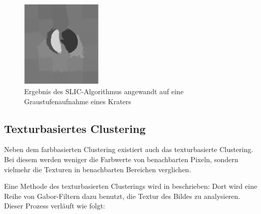 \begin{figure}[h!]
	\centering
	\includegraphics[width=0.35\textwidth,keepaspectratio]{images/gen/GEN_slic_crater.png}
	\captionsetup{format=plain,width=0.35\textwidth}
	\caption{Ergebnis des SLIC-Algorithmus angewandt auf eine Graustufenaufnahme eines Kraters}
	\label{fig:slic_crater}
\end{figure}

\subsection{Texturbasiertes Clustering}

Neben dem farbbasierten Clustering existiert auch das texturbasierte Clustering. Bei diesem werden weniger die Farbwerte von benachbarten Pixeln, sondern vielmehr die Texturen in benachbarten Bereichen verglichen.

Eine Methode des texturbasierten Clusterings wird in \cite{jain_91} beschrieben: Dort wird eine Reihe von Gabor-Filtern dazu benutzt, die Textur des Bildes zu analysieren. Dieser Prozess verläuft wie folgt:

